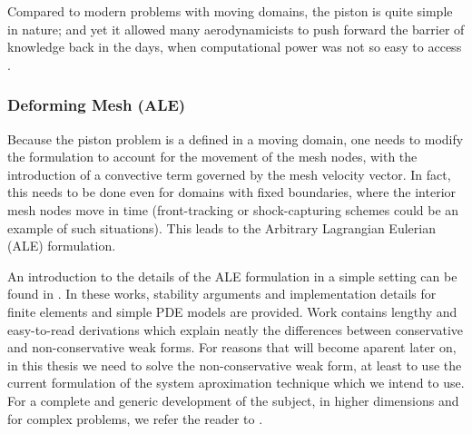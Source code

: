 Compared to modern problems with moving domains,
the piston is quite simple in nature;
and yet it allowed many aerodynamicists to push forward the barrier of knowledge 
back in the days, when computational power was not so easy to access 
\cite{1956_PistonTheoryNewAerodynamicTool}. 

\subsubsection{Deforming Mesh (ALE)}
\label{sec:literature_review_deforming_mesh}
Because the piston problem is a defined in a moving domain,
one needs to modify the formulation to account for the movement 
of the mesh nodes, with the introduction of a convective term 
governed by the mesh velocity vector.
In fact, this needs to be done even for domains with fixed boundaries, 
where the interior mesh nodes move in time 
(front-tracking or shock-capturing schemes could be an example
of such situations).
This leads to the Arbitrary Lagrangian Eulerian (ALE) formulation.


An introduction to the details of the ALE formulation in a simple setting
can be found in
\cite{formaggiaALE,
formaggiaALE_secondOrder,
FSIPistonProblem}.
In these works, stability arguments and implementation details for finite elements
and simple PDE models are provided.
Work \cite{formaggiaALE} contains lengthy and easy-to-read derivations which explain neatly
the differences between conservative and non-conservative weak forms.
For reasons that will become aparent later on,
in this thesis we need to solve the \mbox{non-conservative} weak form,
at least to use the current formulation of the system aproximation technique which 
we intend to use.
For a complete and generic development of the subject,
in higher dimensions and for complex problems,
we refer the reader to 
\cite{doneaALE,
DONEA1982689}.


